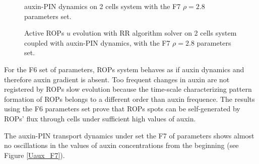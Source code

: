 \begin{figure}[H]
    \centering
    \quad
    \caption[auxin-PIN - with the F7 $\rho = 2.8$ set]{auxin-PIN dynamics on 2 cells system with the F7 $\rho = 2.8$ parameters set.}
    \label{fig:Uaux_F7}
\end{figure}
\begin{figure}[H]
    \centering
    \quad
    \quad
    \quad
    \quad
    \quad
    \quad
    \quad
    \quad
    \caption[2cell RR Active ROPs coupled auxin-PIN - with the F7 $\rho = 2.8$ set]{Active ROPs $u$ evolution with RR algorithm solver on 2 cells system coupled with auxin-PIN dynamics, with the F7 $\rho = 2.8$ parameters set.}
    \label{fig:U_F7}
\end{figure}
For the F6 set of parameters, ROPs system behaves as if auxin dynamics and therefore auxin gradient is absent. Too frequent changes in auxin are not registered by ROPs slow evolution because the time-scale characterizing pattern formation of ROPs belongs to a different order than auxin frequence.
The results using the F6 parameters set prove that ROPs spots can be self-generated by ROPs' flux through cells under sufficient high values of auxin.

The auxin-PIN transport dynamics under set the F7 of parameters shows almost no oscillations in the values of auxin concentrations from the beginning (see Figure \ref{Uaux_F7}).

